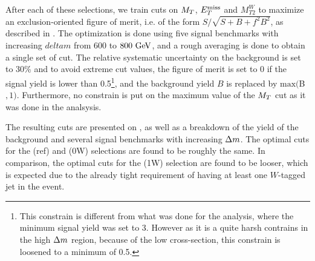             After each of these selections, we train cuts on $M_T$, $E_T^\text{miss}$ and $M_{T2}^{W}$
            to maximize an exclusion-oriented figure of merit, i.e. of the form
            $S/\sqrt{S+B+f^2 B^2}$, as described in . The
            optimization is done using five signal benchmarks with increasing $deltam$ from
            $600$ to $800~\text{GeV}$, and a rough averaging is done to obtain a single set of cut.
            The relative systematic uncertainty on the background is set to 30\% and to avoid
            extreme cut values, the figure of merit is set to 0 if the signal yield is
            lower than 0.5\footnote{This constrain is different from what was done for
            the analysis, where the minimum signal yield was set to 3. However as it is
            a quite harsh contrains in the high $\Delta m$ region, because of the low
            cross-section, this constrain is loosened to a minimum of 0.5.}, and the
            background yield $B$ is replaced by $\text{max}($B$,1)$. Furthermore, no
            constrain is put on the maximum value of the $M_T$ cut as it was done in the
            analsysis.

            The resulting cuts are
            presented on , as well as a breakdown of the
            yield of the background and several signal benchmarks with increasing $\Delta m$.
            The optimal cuts for the (ref) and (0W) selections are found to be roughly
            the same. In comparison, the optimal cuts for the (1W) selection are found
            to be looser, which is expected due to the already tight requirement of having
            at least one $W$-tagged jet in the event.

